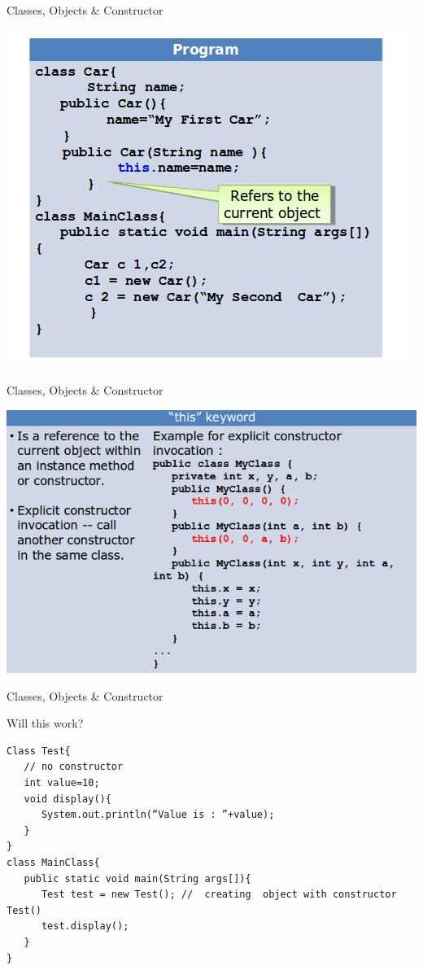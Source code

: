 \documentclass[14pt]{beamer}
\begin{document}
\begin{frame}{Classes, Objects \& Constructor}
\begin{center}
\includegraphics[scale=0.5]{COJ-M01-S03-Image24.png}
\end{center}
\end{frame}
\begin{frame}{Classes, Objects \& Constructor}
\begin{center}
\includegraphics[scale=0.5]{COJ-M01-S03-Image25.png}
\end{center}
\end{frame}
\begin{frame}[fragile]{Classes, Objects \& Constructor}
\begin{block}{}
Will this work?
\end{block}
\begin{lstlisting}[numbers=none]
Class Test{
   // no constructor
   int value=10;
   void display(){
      System.out.println(“Value is : ”+value);
   }
}
class MainClass{
   public static void main(String args[]){
      Test test = new Test(); //  creating  object with constructor Test()
      test.display();
   }
}
\end{lstlisting}
\end{frame}
\end{document}
